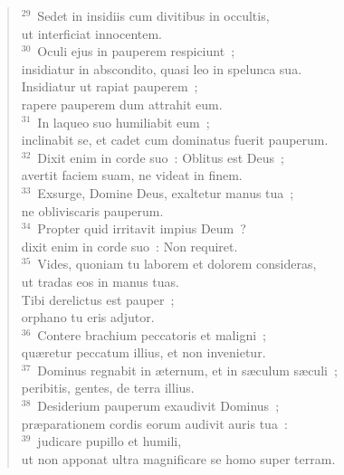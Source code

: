 \begin{verse}
${}^{29}$~Sedet in insidiis cum divitibus in occultis,\\ ut interficiat innocentem.\\
${}^{30}$~Oculi ejus in pauperem respiciunt~;\\ insidiatur in abscondito, quasi leo in spelunca sua.\\ Insidiatur ut rapiat pauperem~;\\ rapere pauperem dum attrahit eum.\\
${}^{31}$~In laqueo suo humiliabit eum~;\\ inclinabit se, et cadet cum dominatus fuerit pauperum.\\
${}^{32}$~Dixit enim in corde suo~: Oblitus est Deus~;\\ avertit faciem suam, ne videat in finem.\\
${}^{33}$~Exsurge, Domine Deus, exaltetur manus tua~;\\ ne obliviscaris pauperum.\\
${}^{34}$~Propter quid irritavit impius Deum~?\\ dixit enim in corde suo~: Non requiret.\\
${}^{35}$~Vides, quoniam tu laborem et dolorem consideras,\\ ut tradas eos in manus tuas.\\ Tibi derelictus est pauper~;\\ orphano tu eris adjutor.\\
${}^{36}$~Contere brachium peccatoris et maligni~;\\ qu\ae retur peccatum illius, et non invenietur.\\
${}^{37}$~Dominus regnabit in \ae ternum, et in s\ae culum s\ae culi~;\\ peribitis, gentes, de terra illius.\\
${}^{38}$~Desiderium pauperum exaudivit Dominus~;\\ pr\ae parationem cordis eorum audivit auris tua~:\\
${}^{39}$~judicare pupillo et humili,\\ ut non apponat ultra magnificare se homo super terram.\end{verse}



